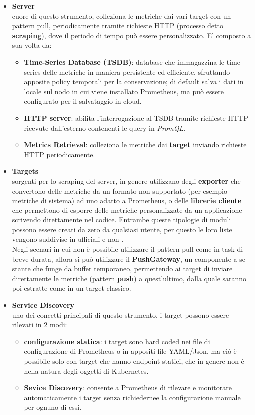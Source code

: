 \begin{itemize}
    \item \textbf{Server} \\
    cuore di questo strumento, colleziona le metriche dai vari target con un pattern pull, periodicamente tramite richieste HTTP (processo detto \textbf{scraping}), dove il periodo di tempo può essere personalizzato. E' composto a sua volta da:
    \begin{itemize} 
        \item \textbf{Time-Series Database (TSDB)}: database che immagazzina le time series delle metriche in maniera persistente ed efficiente, sfruttando apposite policy temporali per la conservazione; di default salva i dati in locale sul nodo in cui viene installato Prometheus, ma può essere configurato per il salvataggio in cloud.
        \item \textbf{HTTP server}: abilita l'interrogazione al TSDB tramite richieste HTTP ricevute dall'esterno contenenti le query in \textit{PromQL}.
        \item \textbf{Metrics Retrieval}: colleziona le metriche dai \textbf{target} inviando richieste HTTP periodicamente.
    \end{itemize}

    \item \textbf{Targets} \\
    sorgenti per lo scraping del server, in genere utilizzano degli \textbf{exporter} che convertono delle metriche da un formato non supportato (per esempio metriche di sistema) ad uno adatto a Prometheus, o delle \textbf{librerie cliente} che permettono di esporre delle metriche personalizzate da un applicazione scrivendo direttamente nel codice. Entrambe queste tipologie di moduli possono essere creati da zero da qualsiasi utente, per questo le loro liste vengono suddivise in ufficiali e non \cite{Prometheus-clients-exporters-list}. \\
    Negli scenari in cui non è possibile utilizzare il pattern pull come in task di breve durata, allora si può utilizzare il \textbf{PushGateway}, un componente a se stante che funge da buffer temporaneo, permettendo ai target di inviare direttamente le metriche (pattern \textbf{push}) a quest'ultimo, dalla quale saranno poi estratte come in un target classico.

    \item \textbf{Service Discovery} \\
    uno dei concetti principali di questo strumento, i target possono essere rilevati in 2 modi: 
    \begin{itemize} 
        \item \textbf{configurazione statica}: i target sono hard coded nei file di configurazione di Prometheus o in appositi file YAML/Json, ma ciò è possibile solo con target che hanno endpoint statici, che in genere non è nella natura degli oggetti di Kubernetes.
        \item \textbf{Sevice Discovery}: consente a Prometheus di rilevare e monitorare automaticamente i target senza richiedernee la configurazione manuale per ognuno di essi.
    \end{itemize}


\end{itemize}
